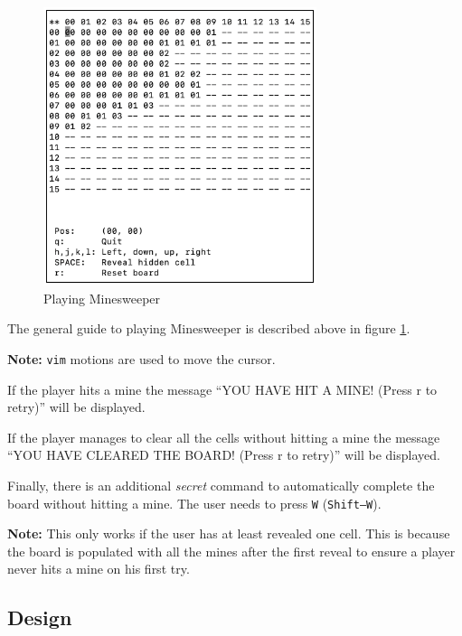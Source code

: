 \documentclass[12pt]{article}
\begin{document}
\begin{figure}[H]
    \centering
    \includegraphics[width=8cm]{./images/playing-minesweeper.png}
    \caption{Playing Minesweeper}
    \label{playing-minesweeper}
\end{figure}

The general guide to playing Minesweeper is described above in
figure \ref{playing-minesweeper}.

\textbf{Note:} \texttt{vim} motions are used to move the cursor.

If the player hits a mine the message ``YOU HAVE HIT A MINE!
(Press r to retry)'' will be displayed. 

If the player manages to clear all the cells without hitting a
mine the message ``YOU HAVE CLEARED THE BOARD! (Press r to
retry)'' will be displayed.

Finally, there is an additional \textit{secret} command to
automatically complete the board without hitting a mine. The
user needs to press \texttt{W} (\texttt{Shift--W}).

\textbf{Note:} This only works if the user has at least revealed
one cell. This is because the board is populated with all the
mines after the first reveal to ensure a player never hits a
mine on his first try.

\subsection{Design}
\end{document}
